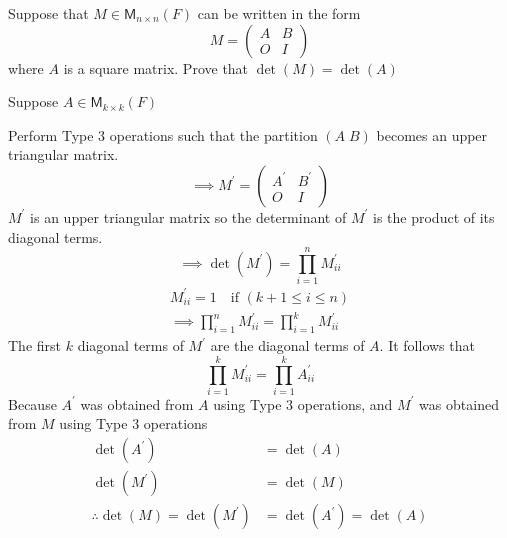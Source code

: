 Suppose that $M \in \mathsf{M}_{n\times n}(F)$ can be written in the
form 
\[
M = \begin{pmatrix} A & B\\O & I
\end{pmatrix}
\]
where $A$ is a square matrix. Prove that $\det{(M)} = \det{(A)}$

Suppose $A \in \mathsf{M}_{k\times k}(F)$

Perform Type 3 operations such that the partition $(A\; B)$ becomes an
upper triangular matrix.
\begin{equation}
\implies M^\prime = \begin{pmatrix} A^\prime & B^\prime \\ O & I
\end{pmatrix}
\end{equation}
$M^\prime$ is an upper triangular matrix so the determinant of $M^\prime$ is
the product of its diagonal terms.
\begin{equation}
\implies \det{(M^\prime)} = \prod\limits_{i=1}^n M^\prime_{ii}
\end{equation}
\begin{gather}
M^\prime_{ii} = 1 \quad \text{if } (k +1 \leq i \leq n)\\
\implies \prod\limits_{i=1}^n M^\prime_{ii} = \prod\limits_{i=1}^k
M^\prime_{ii}
\end{gather}
The first $k$ diagonal terms of $M^\prime$ are the diagonal terms of
$A$. It follows that
\begin{equation}
\prod\limits_{i=1}^k M^\prime_{ii} = \prod\limits_{i=1}^k A^\prime_{ii}
\end{equation}
Because $A^\prime$ was obtained from $A$ using Type 3 operations, and
$M^\prime$ was obtained from $M$ using Type 3 operations
\begin{align}
\det{(A^\prime)} &= \det{(A)}\\
\det{(M^\prime)} &= \det{(M)}\\
\therefore \det{(M)} = \det{(M^\prime)} &= \det{(A^\prime)} = \det{(A)}
\end{align}
